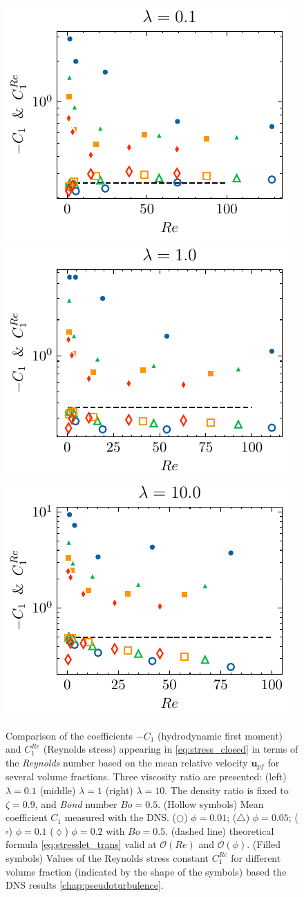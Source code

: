 \begin{figure}[h!]
    \centering
    \includegraphics[height = 0.25\textwidth]{image/HOMOGENEOUS_final/PA/Sdev_l_1.pdf}
    \includegraphics[height = 0.25\textwidth]{image/HOMOGENEOUS_final/PA/Sdev_l_10.pdf}
    \includegraphics[height = 0.25\textwidth]{image/HOMOGENEOUS_final/PA/Sdev_l_100.pdf}
    \caption{
        Comparison of the coefficients $-C_1$ (hydrodynamic first moment) and $C_1^{Re}$ (Reynolds stress) appearing in \ref{eq:stress_closed} in terms of the \textit{Reynolds} number based on the mean relative velocity $\textbf{u}_{pf}$ for several volume fractions.
        Three viscosity ratio are presented: (left) $\lambda = 0.1$ (middle) $\lambda = 1$ (right) $\lambda = 10$. 
        The density ratio is fixed to $\zeta = 0.9$, and \textit{Bond} number $Bo =0.5$. 
        (Hollow symbols) Mean coefficient $C_1$ measured with the DNS. 
        ($\pmb\bigcirc$) $\phi = 0.01$; ($\pmb\triangle$) $ \phi = 0.05$; ($\pmb\square$) $\phi = 0.1$ ($\pmb\lozenge$) $\phi = 0.2$ with $Bo = 0.5$.
        (dashed line) theoretical formula \ref{eq:stresslet_trans} valid at $\mathcal{O}(Re)$ and $\mathcal{O}(\phi)$. 
        (Filled symbols) Values of the Reynolds stress constant $C_1^{Re}$ for different volume fraction (indicated by the shape of the symbols) based the DNS results \eqref{chap:pseudoturbulence}. 
     }
     \label{fig:Sdev_DNS}
\end{figure}


